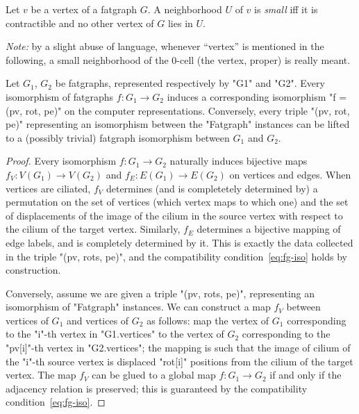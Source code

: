 \begin{definition}
  Let $v$ be a vertex of a fatgraph $G$.  A neighborhood $U$ of $v$ is
  \emph{small} iff it is contractible and no other vertex of $G$ lies
  in $U$.
\end{definition}
\emph{Note:} by a slight abuse of language, whenever ``vertex'' is
mentioned in the following, a small neighborhood of the 0-cell (the
vertex, proper) is really meant.

\begin{lemma}
  Let $G_1$, $G_2$ be fatgraphs, represented respectively by "G1" and
  "G2". Every isomorphism of fatgraphs $f: G_1 \to G_2$ induces a
  corresponding isomorphism "f = (pv, rot, pe)" on the computer
  representations. Conversely, every triple "(pv, rot, pe)"
  representing an isomorphism between the "Fatgraph" instances can be
  lifted to a (possibly trivial) fatgraph isomorphism between $G_1$
  and $G_2$.
\end{lemma}
\begin{proof}
  Every isomorphism $f: G_1 \to G_2$ naturally induces bijective maps
  $f_V: V(G_1) \to V(G_2)$ and $f_E: E(G_1) \to E(G_2)$ on vertices
  and edges.  When vertices are ciliated, $f_V$ determines (and is
  completetely determined by) a permutation on the set of vertices
  (which vertex maps to which one) and the set of displacements of the image of the
  cilium in the source vertex with respect to the
  cilium of the target vertex.  Similarly, $f_E$ determines a
  bijective mapping of edge labels, and is completely determined by
  it.  This is exactly the data collected in the triple "(pv, rots, pe)", 
  and the compatibility condition~\eqref{eq:fg-iso} holds by
  construction.

  Conversely, assume we are given a triple "(pv, rots, pe)",
  representing an isomorphism of "Fatgraph" instances.  We can
  construct a map $f_V$ between vertices of $G_1$ and vertices of
  $G_2$ as follows: map the vertex of $G_1$ corresponding to the
  "i"-th vertex in "G1.vertices" to the vertex of $G_2$ corresponding
  to the "pv[i]"-th vertex in "G2.vertices"; the mapping is such that
  the image of cilium of the "i"-th source vertex is displaced
  "rot[i]" positions from the cilium of the target vertex.  The map
  $f_V$ can be glued to a global map $f: G_1 \to G_2$ if and only if
  the adjacency relation is preserved; this is guaranteed by the
  compatibility condition~\eqref{eq:fg-iso}.
\end{proof}

